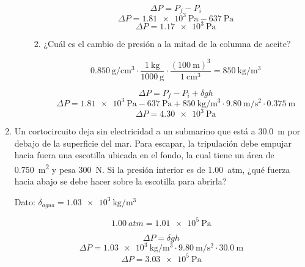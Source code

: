 \documentclass[../practica.root.tex]{subfiles}
\begin{document}
\begin{enumerate}
\begin{enumerate}
\begin{enumerate}
			                  \[\Delta P=P_f-P_i\]
			                  \[\Delta P=\SI{1,81e3}{\pascal}-\SI{637}{\pascal}\]
			                  \[\Delta P=\boxed{\SI{1,17e3}{\pascal}}\]

			            \item ¿Cuál es el cambio de presión a la mitad de la columna de aceite?

			                  \[\SI{0,850}{\gram\per\centi\meter\cubed}\cdot\frac{\SI{1}{\kilogram}}{\SI{1000}{\gram}}\cdot\frac{(\SI{100}{\meter})^3}{\SI{1}{\cm\cubed}}=\SI{850}{\kilogram\per\meter\cubed}\]

			                  \[\Delta P=P_f-P_i+\delta gh\]
			                  \[\Delta P=\SI{1,81e3}{\pascal}-\SI{637}{\pascal}+\SI{850}{\kilogram\per\meter\cubed}\cdot\SI{9,80}{\meter\per\second\squared}\cdot\SI{0,375}{\meter}\]
			                  \[\Delta P=\boxed{\SI{4,30e3}{\pascal}}\]
		            \end{enumerate}
	      \end{enumerate}

	\item Un cortocircuito deja sin electricidad a un submarino que está a \SI{30,0}{\meter} por debajo de la superficie del mar. Para escapar, la tripulación debe empujar hacia fuera una escotilla ubicada en el fondo, la cual tiene un área de \SI{0,750}{\meter\squared} y pesa \SI{300}{\newton}. Si la presión interior es de \SI{1,00}{atm}, ¿qué fuerza hacia abajo se debe hacer sobre la escotilla para abrirla?

	      Dato: $\delta_{agua}=\SI{1,03e3}{\kilogram\per\meter\cubed}$

	      \begin{center}
	      \end{center}

	      \[\SI{1,00}{atm}=\SI{1,01e5}{\pascal}\]

	      \[\Delta P=\delta gh\]
	      \[\Delta P=\SI{1,03e3}{\kilogram\per\meter\cubed}\cdot\SI{9,80}{\meter\per\second\squared}\cdot\SI{30,0}{\meter}\]
	      \[\Delta P=\SI{3,03e5}{\pascal}\]


\end{enumerate}
\end{document}
